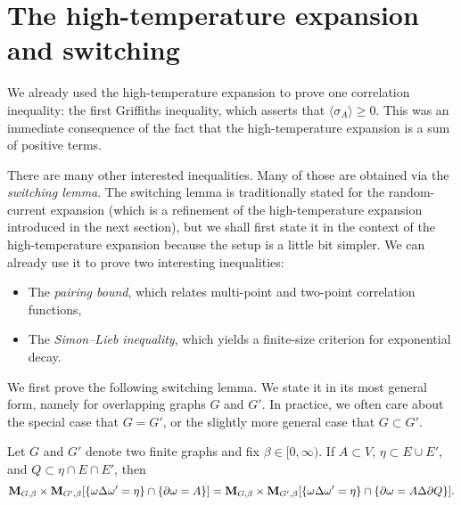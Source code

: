 \section{The high-temperature expansion and switching}

We already used the high-temperature expansion to prove one correlation inequality:
the first Griffiths inequality, which asserts that $\langle\sigma_A\rangle\geq 0$.
This was an immediate consequence of the fact that the high-temperature expansion is a sum of positive terms.

There are many other interested inequalities.
Many of those are obtained via the \emph{switching lemma}.
The switching lemma is traditionally stated for the random-current expansion
(which is a refinement of the high-temperature expansion introduced in the next section),
but we shall first state it in the context of the high-temperature expansion
because the setup is a little bit simpler.
We can already use it to prove two interesting inequalities:
\begin{itemize}
    \item The \emph{pairing bound}, which relates multi-point and two-point correlation functions,
    \item The \emph{Simon--Lieb inequality}, which yields a finite-size criterion for exponential decay.
\end{itemize}

We first prove the following switching lemma.
We state it in its most general form,
namely for overlapping graphs $G$ and $G'$.
In practice, we often care about the special case that $G=G'$, or the slightly more general
case that $G\subset G'$.

\begin{lemma}
    \label{lemma:switching_high_t}
    Let $G$ and $G'$ denote two finite graphs and fix $\beta\in[0,\infty)$.
    If $A\subset V$, $\eta\subset E\cup E'$, and $Q\subset \eta\cap E\cap E'$,
    then 
    \begin{equation}
        \mathbf{M}_{G,\beta}\times\mathbf{M}_{G',\beta}
        [\{\omega\Delta\omega'=\eta\}\cap \{\partial\omega=A\}]
        =
        \mathbf{M}_{G,\beta}\times\mathbf{M}_{G',\beta}
        [\{\omega\Delta\omega'=\eta\}\cap \{\partial\omega= A\Delta\partial Q\}].
    \end{equation}
\end{lemma}

